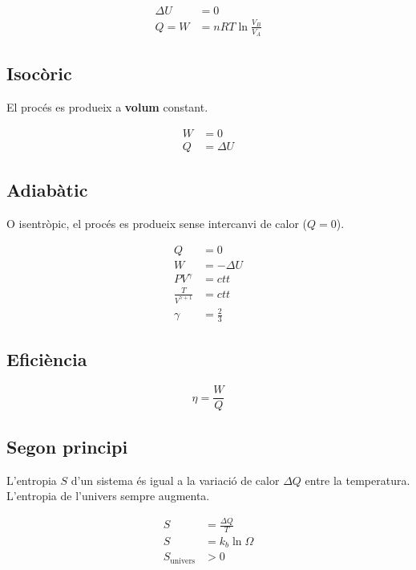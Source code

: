 \begin{align}
    \Delta U &= 0\\
    Q = W &= nRT\ln\frac{V_B}{V_A}
\end{align}

\subsection{Isocòric}
\label{sub:isocoric}
El procés es produeix a \textbf{volum} constant.

\begin{align}
    W &= 0\\
    Q &= \Delta U
\end{align}

\pagebreak

\subsection{Adiabàtic}
\label{sub:adiabatic}
O isentròpic, el procés es produeix sense intercanvi de calor ($Q=0$).

\begin{align}
    Q &= 0\nonumber\\
    W &= -\Delta U \\
    PV^\gamma &= ctt \\
    \frac{T}{V^{\gamma + 1}} &= ctt \\
    \gamma &= \frac{2}{3} \nonumber
\end{align}

\subsection{Eficiència}
\label{sub:eficiencia}

\begin{equation}
    \eta = \frac{W}{Q}
\end{equation}

\subsection{Segon principi}
\label{sub:segon_principi}

L'entropia $S$ d'un sistema és igual a la variació de calor $\Delta Q$ entre la
temperatura. L'entropia de l'univers sempre augmenta.

\begin{align}
    S &= \frac{\Delta Q}{T} \\
    S &= k_b \ln \Omega \\
    S_\text{univers} &> 0
\end{align}

